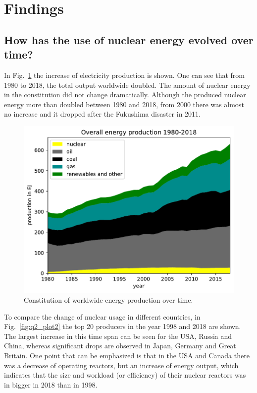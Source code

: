 \documentclass[a4paper,10pt,twocolumn]{scrartcl}
\begin{document}
\section{Findings}

\subsection{How has the use of nuclear energy evolved over time?}

In Fig.~\ref{fig:q1_plot1} the increase of electricity production is shown. One can see that from 1980 to 2018, the total output worldwide doubled. The amount of nuclear energy in the constitution did not change dramatically. Although the produced nuclear energy more than doubled between 1980 and 2018, from 2000 there was almost no increase and it dropped after the Fukushima disaster in 2011.

\begin{figure}[h]
	\centering
 	\includegraphics[width=\columnwidth]{../figures/q1_plot1.pdf}
 	\caption{Constitution of worldwide energy production over time.}
 	\label{fig:q1_plot1}
\end{figure}

To compare the change of nuclear usage in different countries, in Fig.~\ref{fig:q2_plot2} the top 20 producers in the year 1998 and 2018 are shown. The largest increase in this time span can be seen for the USA, Russia and China, whereas significant drops are observed in Japan, Germany and Great Britain. One point that can be emphasized is that in the USA and Canada there was a decrease of operating reactors, but an increase of energy output, which indicates that the size and workload (or efficiency) of their nuclear reactors was in bigger in 2018 than in 1998.
\end{document}
